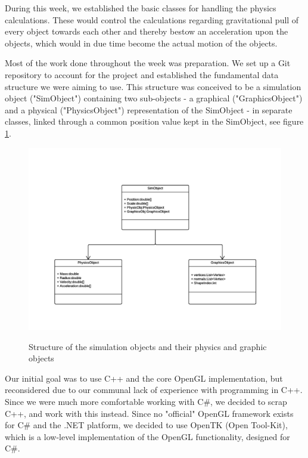 During this week, we established the basic classes for handling the physics calculations. These would control the calculations regarding gravitational pull of every object towards each other and thereby bestow an acceleration upon the objects, which would in due time become the actual motion of the objects.

Most of the work done throughout the week was preparation. We set up a Git repository to account for the project and established the fundamental data structure we were aiming to use. This structure was conceived to be a simulation object ("SimObject") containing two sub-objects - a graphical ("GraphicsObject") and a physical ("PhysicsObject") representation of the SimObject - in separate classes, linked through a common position value kept in the SimObject, see figure \ref{GraphicsObjects}.\\
\begin{figure}[h]
\centering
\includegraphics[scale=0.7]{GraphicsProjectObjects.png}
\label{GraphicsObjects}
\caption{Structure of the simulation objects and their physics and graphic objects}
\end{figure}

Our initial goal was to use C++ and the core OpenGL implementation, but reconsidered due to our communal lack of experience with programming in C++. Since we were much more comfortable working with C\#, we decided to scrap C++, and work with this instead. Since no "official" OpenGL framework exists for C\# and the .NET platform, we decided to use OpenTK (Open Tool-Kit), which is a low-level implementation of the OpenGL functionality, designed for C\#.\\

